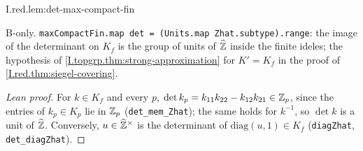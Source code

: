 \begin{lemma}[$\det K_f=\Zhat^\times$]
\bonly
{}
\end{lemma}
\begin{tfformal}{I.red.lem:det-max-compact-fin}
\begin{tffidelity}
B-only. \texttt{maxCompactFin.map det = (Units.map Zhat.subtype).range}: the image of the determinant on $K_f$ is the group of units of $\widehat{\mathbb{Z}}$ inside the finite ideles; the hypothesis of \cref{I.topgrp.thm:strong-approximation} for $K'=K_f$ in the proof of \cref{I.red.thm:siegel-covering}.
\end{tffidelity}
\end{tfformal}
\begin{proof}[Lean proof]
For $k\in K_f$ and every $p$, $\det k_p=k_{11}k_{22}-k_{12}k_{21}\in\mathbb{Z}_p$, since the entries of $k_p\in K_p$ lie in $\mathbb{Z}_p$ (\texttt{det\_mem\_Zhat}); the same holds for $k^{-1}$, so $\det k$ is a unit of $\widehat{\mathbb{Z}}$. Conversely, $u\in\widehat{\mathbb{Z}}^\times$ is the determinant of $\mathrm{diag}(u,1)\in K_f$ (\texttt{diagZhat}, \texttt{det\_diagZhat}).
\end{proof}

